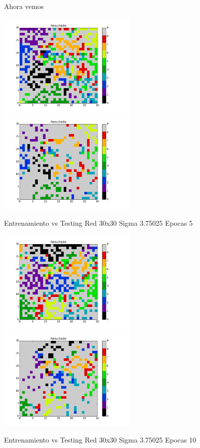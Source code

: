 Ahora vemos

\includegraphics[width=0.5\textwidth]{img/Ej2_Epocas/train_M_30_sigma_3_75025_epocas_5}
\includegraphics[width=0.5\textwidth]{img/Ej2_Epocas/test_M_30_sigma_3_75025_epocas_5}
{\center \footnotesize Entrenamiento vs Testing Red 30x30 Sigma 3.75025 Epocas 5\par}

\includegraphics[width=0.5\textwidth]{img/Ej2_Epocas/train_M_30_sigma_3_75025_epocas_10}
\includegraphics[width=0.5\textwidth]{img/Ej2_Epocas/test_M_30_sigma_3_75025_epocas_10}
{\center \footnotesize Entrenamiento vs Testing Red 30x30 Sigma 3.75025 Epocas 10\par}

